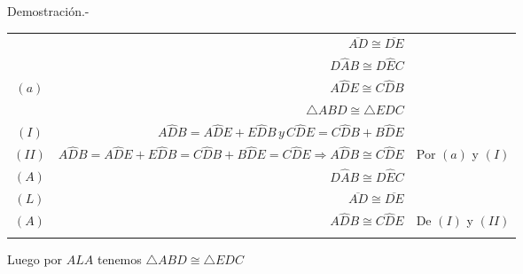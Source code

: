 \documentclass[10pt]{article}
\begin{document}
\begin{enumerate}
	Demostración.-\;

	\begin{center}
	    \begin{tabular}{crc}
		&$\overline{AD}\cong \overline{DE}$&\\
		&$D\widehat{A}B \cong D\widehat{E}C$&\\		
		$(a)$&$A\widehat{D}E \cong C\widehat{D}B$&\\	
		&$\triangle ABD \cong \triangle EDC$&\\
		$(I)$&$A\widehat{D}B=A\widehat{D}E + E\widehat{D}B \, y \, C\widehat{D}E=C\widehat{D}B+B\widehat{D}E$&\\
		$(II)$&$A\widehat{D}B =A\widehat{D}E + E\widehat{D}B=C\widehat{D}B + B\widehat{D}E=C\widehat{D}E \Rightarrow A\widehat{D}B \cong C\widehat{D}E$&Por $(a)$ y $(I)$ \\
		$(A)$&$D\widehat{A}B \cong D\widehat{E}C$&\\
		$(L)$&$\overline{AD}\cong \overline{DE}$&\\
		$(A)$&$ A\widehat{D}B \cong C\widehat{D}E$&De $(I)$ y $(II)$\\\\
	    \end{tabular}
	\end{center}
	Luego por $ALA$ tenemos $\triangle ABD \cong \triangle EDC$\\\\

    \end{enumerate}
\end{document}
